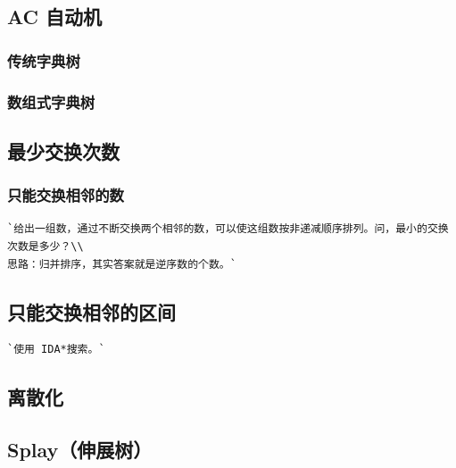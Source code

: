 \documentclass[a4paper]{article}
\begin{document}
\begin{CJK*}{UTF8}{gbsn}
\begin{multicols}{3}
\begin{flushleft}
\subsection{AC 自动机}


\subsubsection{传统字典树}


\subsubsection{数组式字典树}



\subsection{最少交换次数}

\subsubsection{只能交换相邻的数}
\begin{lstlisting}
`给出一组数，通过不断交换两个相邻的数，可以使这组数按非递减顺序排列。问，最小的交换次数是多少？\\
思路：归并排序，其实答案就是逆序数的个数。`
\end{lstlisting}

\subsection{只能交换相邻的区间}
\begin{lstlisting}
`使用 IDA*搜索。`
\end{lstlisting}


\subsection{离散化}


\subsection{Splay（伸展树）}



\end{flushleft}
\end{multicols}
\end{CJK*}
\end{document}

